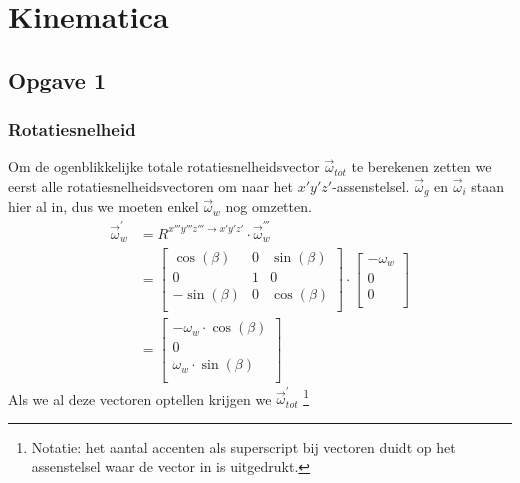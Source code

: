 \section{Kinematica}
\subsection{Opgave 1}
\subsubsection{Rotatiesnelheid}
Om de ogenblikkelijke totale rotatiesnelheidsvector $\vec{\omega}_{tot}$ te berekenen zetten we eerst alle rotatiesnelheidsvectoren om naar het $x'y'z'$-assenstelsel. $\vec{\omega}_{g}$ en $\vec{\omega}_{i}$ staan hier al in, dus we moeten enkel $\vec{\omega}_{w}$ nog omzetten. 
\begin{equation}
\begin{split}
\vec{\omega}_{w}^{'}&=R^{x'''y'''z''' \rightarrow x'y'z'} \cdot \vec{\omega}_{w}^{'''}\\
&=\begin{bmatrix}
\cos(\beta)	&			0			&\sin(\beta)\\
0						&			1			&			0		 \\
-\sin(\beta)&			0			&\cos(\beta)\\
\end{bmatrix}
\cdot
\begin{bmatrix}
-\omega_{w}	\\
0						\\
0						\\
\end{bmatrix}\\
&=
\begin{bmatrix}
-\omega_{w}\cdot \cos(\beta)	\\
0						\\
\omega_{w}\cdot \sin(\beta)	\\
\end{bmatrix}
\end{split}
\label{eq:kin1.1}
\end{equation}
Als we al deze vectoren optellen krijgen we $\vec{\omega}_{tot}^{'}$ \footnote{Notatie: het aantal accenten als superscript bij vectoren duidt op het assenstelsel waar de vector in is uitgedrukt.}
